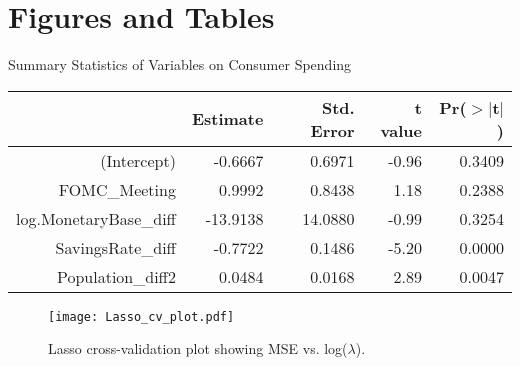 \documentclass[12pt,english]{article}
\begin{document}
\vfill
\pagebreak{}
\begin{spacing}{1.0}


\end{spacing}

\vfill
\pagebreak{}
\clearpage

\section*{Figures and Tables}\label{sec:figTables}



\caption{Summary Statistics of Variables on Consumer Spending}
\begin{table}[ht]
\centering
\begin{tabular}{rrrrr}
  \hline
 & Estimate & Std. Error & t value & Pr($>$$|$t$|$) \\ 
  \hline
(Intercept) & -0.6667 & 0.6971 & -0.96 & 0.3409 \\ 
  FOMC\_Meeting & 0.9992 & 0.8438 & 1.18 & 0.2388 \\ 
  log.MonetaryBase\_diff & -13.9138 & 14.0880 & -0.99 & 0.3254 \\ 
  SavingsRate\_diff & -0.7722 & 0.1486 & -5.20 & 0.0000 \\ 
  Population\_diff2 & 0.0484 & 0.0168 & 2.89 & 0.0047 \\ 
   \hline
\end{tabular}
\end{table}

\begin{figure}
    \centering
    \texttt{[image: Lasso\_cv\_plot.pdf]}
    \caption{Lasso cross-validation plot showing MSE vs. log($\lambda$).}
    \label{fig:Lasso-cv}
\end{figure}
\end{document}
